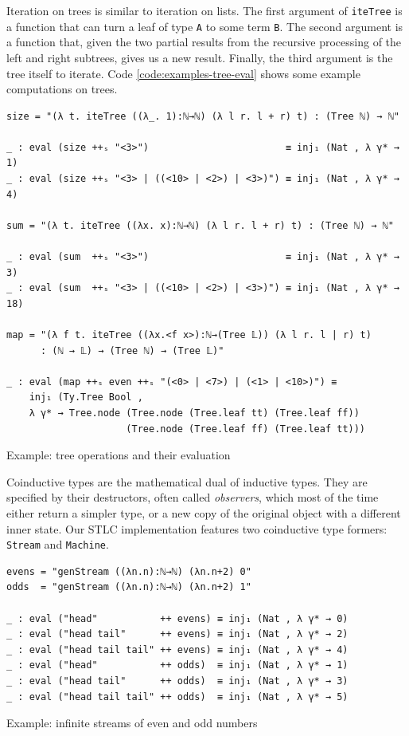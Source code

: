 Iteration on trees is similar to iteration on lists. The first argument of \verb$iteTree$ is a function that can turn a leaf of type \verb$A$ to some term \verb$B$. The second argument is a function that, given the two partial results from the recursive processing of the left and right subtrees, gives us a new result. Finally, the third argument is the tree itself to iterate. Code \ref{code:examples-tree-eval} shows some example computations on trees.

\begin{listing}[H]
\begin{verbatim}
size = "(λ t. iteTree ((λ_. 1):ℕ→ℕ) (λ l r. l + r) t) : (Tree ℕ) → ℕ"

_ : eval (size ++ₛ "<3>")                        ≡ inj₁ (Nat , λ γ* → 1)
_ : eval (size ++ₛ "<3> | ((<10> | <2>) | <3>)") ≡ inj₁ (Nat , λ γ* → 4)

sum = "(λ t. iteTree ((λx. x):ℕ→ℕ) (λ l r. l + r) t) : (Tree ℕ) → ℕ"

_ : eval (sum  ++ₛ "<3>")                        ≡ inj₁ (Nat , λ γ* → 3)
_ : eval (sum  ++ₛ "<3> | ((<10> | <2>) | <3>)") ≡ inj₁ (Nat , λ γ* → 18)

map = "(λ f t. iteTree ((λx.<f x>):ℕ→(Tree 𝕃)) (λ l r. l | r) t)
      : (ℕ → 𝕃) → (Tree ℕ) → (Tree 𝕃)"

_ : eval (map ++ₛ even ++ₛ "(<0> | <7>) | (<1> | <10>)") ≡
    inj₁ (Ty.Tree Bool ,
    λ γ* → Tree.node (Tree.node (Tree.leaf tt) (Tree.leaf ff))
                     (Tree.node (Tree.leaf ff) (Tree.leaf tt)))
\end{verbatim}
\caption{Example: tree operations and their evaluation}
\label{code:examples-tree-eval}
\end{listing}

Coinductive types are the mathematical dual of inductive types. They are specified by their destructors, often called \textit{observers}, which most of the time either return a simpler type, or a new copy of the original object with a different inner state. Our STLC implementation features two coinductive type formers: \verb$Stream$ and \verb$Machine$.

\begin{listing}[H]
\begin{verbatim}
evens = "genStream ((λn.n):ℕ→ℕ) (λn.n+2) 0"
odds  = "genStream ((λn.n):ℕ→ℕ) (λn.n+2) 1"

_ : eval ("head"           ++ evens) ≡ inj₁ (Nat , λ γ* → 0)
_ : eval ("head tail"      ++ evens) ≡ inj₁ (Nat , λ γ* → 2)
_ : eval ("head tail tail" ++ evens) ≡ inj₁ (Nat , λ γ* → 4)
_ : eval ("head"           ++ odds)  ≡ inj₁ (Nat , λ γ* → 1)
_ : eval ("head tail"      ++ odds)  ≡ inj₁ (Nat , λ γ* → 3)
_ : eval ("head tail tail" ++ odds)  ≡ inj₁ (Nat , λ γ* → 5)
\end{verbatim}
\caption{Example: infinite streams of even and odd numbers}
\label{code:examples-streams-1}
\end{listing}

